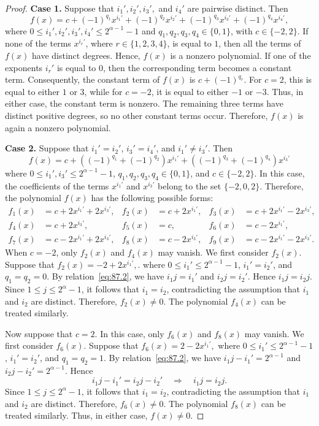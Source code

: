 \documentclass[12pt]{article}
\begin{document}
\begin{proof}
\textbf{Case 1.} Suppose that $i_1', i_2', i_3',$ and $i_4'$ are pairwise distinct. Then
\[
f(x)=c+(-1)^{q_1}x^{i_1'}+(-1)^{q_2}x^{i_2'}+(-1)^{q_3}x^{i_3'}+(-1)^{q_4}x^{i_4'},
\]
where $0\le i_1',i_2',i_3',i_4'\le 2^{\alpha-1}-1$ and $q_1,q_2,q_3,q_4\in\{0,1\}$, with $c\in\{-2,2\}$.
If none of the terms $x^{i_r'}$, where $r\in\{1,2,3,4\}$, is equal to $1$, then all the terms of $f(x)$ have distinct degrees. Hence, $f(x)$ is a nonzero polynomial.
If one of the exponents $i_r'$ is equal to $0$, then the corresponding term becomes a constant term. Consequently, the constant term of $f(x)$ is
$
c+(-1)^{q_r}.
$
For $c=2$, this is equal to either $1$ or $3$, while for $c=-2$, it is equal to either $-1$ or $-3$. Thus, in either case, the constant term is nonzero. The remaining three terms have distinct positive degrees, so no other constant terms occur. Therefore, $f(x)$ is again a nonzero polynomial.
\medskip

\textbf{Case 2.} Suppose that $i_1'=i_2'$, $i_3'=i_4'$, and $i_1'\neq i_3'$. Then
\[
f(x)=c+\left((-1)^{q_1}+(-1)^{q_2}\right)x^{i_1'}
+\left((-1)^{q_3}+(-1)^{q_4}\right)x^{i_3'}
\]
where $0\le i_1',i_3'\le2^{\alpha-1}-1$, $q_1,q_2,q_3,q_4\in\{0,1\}$, and $c\in\{-2,2\}$. In this case, the coefficients of the terms $x^{i_1'}$ and $x^{i_3'}$ belong to the set $\{-2,0,2\}$. Therefore, the polynomial $f(x)$ has the following possible forms:
\[
\begin{aligned}
	f_1(x)&=c+2x^{i_1'}+2x^{i_3'},&
	f_2(x)&=c+2x^{i_1'},&
	f_3(x)&=c+2x^{i_1'}-2x^{i_3'},\\
	f_4(x)&=c+2x^{i_3'},&
	f_5(x)&=c,&
	f_6(x)&=c-2x^{i_1'},\\
	f_7(x)&=c-2x^{i_1'}+2x^{i_3'},&
	f_8(x)&=c-2x^{i_3'},&
	f_9(x)&=c-2x^{i_1'}-2x^{i_3'}.
\end{aligned}
\]
When $c=-2$, only $f_2(x)$ and $f_4(x)$ may vanish. We first consider $f_2(x)$. Suppose that
$
f_2(x)=-2+2x^{i_1'},
$.
where $0\le i_1'\le2^{\alpha-1}-1$, $i_1'=i_2'$, and $q_1=q_2=0$. By relation~\eqref{eq:87.2}, we have
$
i_1j=i_1'$ and $i_2j=i_2'$.
Hence $i_1j=i_2j.$
Since $1\le j\le2^\alpha-1$, it follows that $i_1=i_2$, contradicting the assumption that $i_1$ and $i_2$ are distinct. Therefore, $f_2(x)\ne0$. The polynomial $f_4(x)$ can be treated similarly.

Now suppose that $c=2$. In this case, only $f_6(x)$ and $f_8(x)$ may vanish. We first consider $f_6(x)$. Suppose that
$
f_6(x)=2-2x^{i_1'},
$
where $0\le i_1'\le2^{\alpha-1}-1$, $i_1'=i_2'$, and $q_1=q_2=1$. By relation~\eqref{eq:87.2}, we have
$
i_1j-i_1'=2^{\alpha-1}$
and
$i_2j-i_2'=2^{\alpha-1}.$
Hence
\[
i_1j-i_1'=i_2j-i_2'
\quad\Longrightarrow\quad
i_1j=i_2j.
\]
Since $1\le j\le2^\alpha-1$, it follows that $i_1=i_2$, contradicting the assumption that $i_1$ and $i_2$ are distinct. Therefore, $f_6(x)\ne0$. The polynomial $f_8(x)$ can be treated similarly. Thus, in either case, $f(x)\ne0$.


\end{proof}
\end{document}
